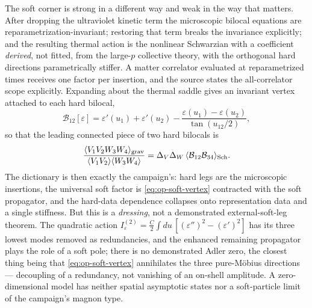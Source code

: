 The soft corner is strong in a different way and weak in the way that matters.
After dropping the ultraviolet kinetic term the microscopic bilocal equations
are reparametrization-invariant; restoring that term breaks the invariance
explicitly; and the resulting thermal action is the nonlinear Schwarzian with a
coefficient \emph{derived}, not fitted, from the large-$p$ collective theory,
with the orthogonal hard directions parametrically stiffer. A matter correlator
evaluated at reparametrized times receives one factor per insertion, and the
source states the all-correlator scope explicitly. Expanding about the thermal
saddle gives an invariant vertex attached to each hard bilocal,
\begin{equation}
  \mathcal{B}_{12}[\varepsilon]
  =\varepsilon'(u_1)+\varepsilon'(u_2)
   -\frac{\varepsilon(u_1)-\varepsilon(u_2)}{\tan(u_{12}/2)},
  \label{eq:op-soft-vertex}
\end{equation}
so that the leading connected piece of two hard bilocals is
\begin{equation}
  \frac{\langle V_1V_2W_3W_4\rangle_{\mathrm{grav}}}
       {\langle V_1V_2\rangle\langle W_3W_4\rangle}
  =\Delta_V\Delta_W\,
   \langle \mathcal{B}_{12}\mathcal{B}_{34}\rangle_{\mathrm{Sch}} .
  \label{eq:op-soft-dressing}
\end{equation}
The dictionary is then exactly the campaign's: hard legs are the microscopic
insertions, the universal soft factor is \eqref{eq:op-soft-vertex} contracted
with the soft propagator, and the hard-data dependence collapses onto
representation data and a single stiffness. But this is a \emph{dressing}, not
a demonstrated external-soft-leg theorem. The quadratic action
$I^{(2)}_\varepsilon=\tfrac{C}{2}\int du\,[(\varepsilon'')^2-(\varepsilon')^2]$
has its three lowest modes removed as redundancies, and the enhanced remaining
propagator plays the role of a soft pole; there is no demonstrated Adler zero,
the closest thing being that \eqref{eq:op-soft-vertex} annihilates the three
pure-M\"obius directions --- decoupling of a redundancy, not vanishing of an
on-shell amplitude. A zero-dimensional model has neither spatial asymptotic
states nor a soft-particle limit of the campaign's magnon type.

